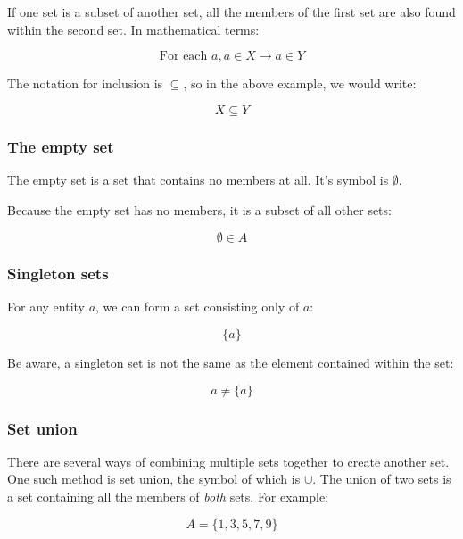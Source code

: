 \documentclass{article}
\begin{document}
If one set is a subset of another set, all the members of the first set are also found within the second set. In mathematical terms:

\[
	\textrm{For each }a, a \in X \rightarrow a \in Y
\]

The notation for inclusion is $\subseteq$, so in the above example, we would
write:


\[
	X \subseteq Y
\]

\subsubsection{The empty set}

The empty set is a set that contains no members at all. It's symbol is
$\emptyset$.

Because the empty set has no members, it is a subset of all other sets:


\[
	\emptyset \in A
\]

\subsubsection{Singleton sets}

For any entity $a$, we can form a set consisting only of $a$:

\[
	\{a\}
\]

Be aware, a singleton set is not the same as the element contained within the set:

\[
	a \neq \{a\}
\]

\subsubsection{Set union}

There are several ways of combining multiple sets together to create another
set. One such method is set union, the symbol of which is $\cup$. The union of
two sets is a set containing all the members of {\it both} sets. For example:

\[
	A = \{1, 3, 5, 7, 9\}
\]
\end{document}
